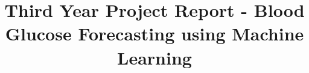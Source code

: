 
\newcommand{\degree}{\ensuremath{^\circ}}
\newcommand{\sus}[1]{$^{\mbox{\scriptsize #1}}$} %
\newcommand{\sub}[1]{$_{\mbox{\scriptsize #1}}$} %
\newcommand{\sect}[1]{Section~\ref{#1}}
\newcommand{\fig}[1]{Fig.~\ref{#1}}
\newcommand{\tab}[1]{Table~\ref{#1}}
\newcommand{\equ}[1]{(\ref{#1})}
\newcommand{\appx}[1]{Appendix~\ref{#1}}




\usepackage[style=ieee,backend=biber,backref=true,hyperref=auto]{biblatex}


  \renewcommand*{\bibfont}{\large}








\makeatletter
\title{Third Year Project Report - Blood Glucose Forecasting using Machine Learning}
\makeatother

                                                   
\maketitle


